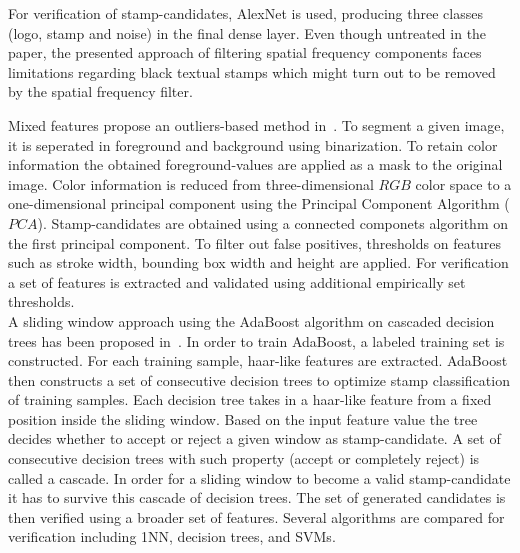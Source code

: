 \begin{description}
\begin{enumerate*}[label={\alph*)},font={\color{red!50!black}\bfseries}]
        For verification of stamp-candidates, AlexNet is used, producing three
        classes (logo, stamp and noise) in the final dense layer. Even though
        untreated in the paper, the presented approach of filtering spatial
        frequency components faces limitations regarding black textual stamps
        which might turn out to be removed by the spatial frequency filter.\\
        \item [Mixed features]
        \citeauthor*{Dey.16.12.201519.12.2015} propose an outliers-based
        method in~\cite{Dey.16.12.201519.12.2015}. To segment a given image,
        it is seperated in foreground and background using binarization. To
        retain color information the obtained foreground-values are applied as
        a mask to the original image. Color information is reduced from
        three-dimensional \(RGB\) color space to a one-dimensional principal
        component using the Principal Component Algorithm (\(PCA\)).
        Stamp-candidates are obtained using a connected componets algorithm on
        the first principal component. To filter out false positives,
        thresholds on features such as stroke width, bounding box width and
        height are applied. For verification a set of features is extracted and
        validated using additional empirically set thresholds.\\

        A sliding window approach using the AdaBoost algorithm on cascaded
        decision trees has been proposed in~\cite{Forczmanski.2016}. In order
        to train AdaBoost, a labeled training set is constructed. For each
        training sample, haar-like features are extracted. AdaBoost then
        constructs a set of consecutive decision trees to optimize stamp
        classification of training samples. Each decision tree takes in a
        haar-like feature from a fixed position inside the sliding window.
        Based on the input feature value the tree decides whether to accept or
        reject a given window as stamp-candidate. A set of consecutive decision
        trees with such property (accept or completely reject) is called a
        cascade. In order for a sliding window to become a valid
        stamp-candidate it has to survive this cascade of decision trees. The
        set of generated candidates is then verified using a broader set of
        features. Several algorithms are compared for verification including
        1NN, decision trees, and SVMs.\\


\end{enumerate*}
\end{description}
